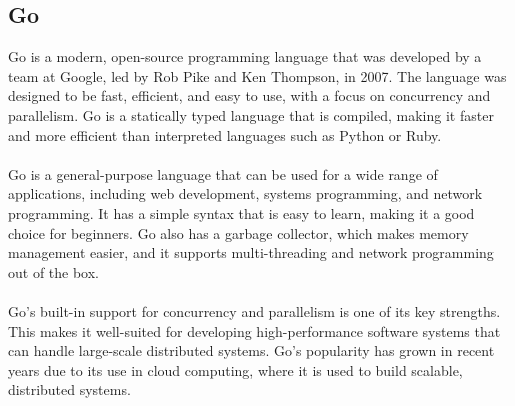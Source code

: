 \documentclass{dclass}
\begin{document}
\subsection{Go}

Go is a modern, open-source programming language that was developed by a team at Google, led by Rob Pike and Ken Thompson, in 2007. The language was designed to be fast, efficient, and easy to use, with a focus on concurrency and parallelism. Go is a statically typed language that is compiled, making it faster and more efficient than interpreted languages such as Python or Ruby.\\\\
Go is a general-purpose language that can be used for a wide range of applications, including web development, systems programming, and network programming. It has a simple syntax that is easy to learn, making it a good choice for beginners. Go also has a garbage collector, which makes memory management easier, and it supports multi-threading and network programming out of the box.\\\\
Go's built-in support for concurrency and parallelism is one of its key strengths. This makes it well-suited for developing high-performance software systems that can handle large-scale distributed systems. Go's popularity has grown in recent years due to its use in cloud computing, where it is used to build scalable, distributed systems.\\
\end{document}
